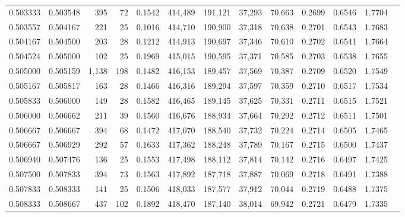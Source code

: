 \begin{tabular}{rrrrrrrrrrrrr}
0.503333 & 0.503548 &   395 &  72 &                                     0.1542 & 414,489 & 191,121 &  37,293 &  70,663 & 0.2699 & 0.6546 & 1.7704 \\
0.503557 & 0.504167 &   221 &  25 &                                     0.1016 & 414,710 & 190,900 &  37,318 &  70,638 & 0.2701 & 0.6543 & 1.7683 \\
0.504167 & 0.504500 &   203 &  28 &                                     0.1212 & 414,913 & 190,697 &  37,346 &  70,610 & 0.2702 & 0.6541 & 1.7664 \\
0.504524 & 0.505000 &   102 &  25 &                                     0.1969 & 415,015 & 190,595 &  37,371 &  70,585 & 0.2703 & 0.6538 & 1.7655 \\
0.505000 & 0.505159 & 1,138 & 198 &                                     0.1482 & 416,153 & 189,457 &  37,569 &  70,387 & 0.2709 & 0.6520 & 1.7549 \\
0.505167 & 0.505817 &   163 &  28 &                                     0.1466 & 416,316 & 189,294 &  37,597 &  70,359 & 0.2710 & 0.6517 & 1.7534 \\
0.505833 & 0.506000 &   149 &  28 &                                     0.1582 & 416,465 & 189,145 &  37,625 &  70,331 & 0.2711 & 0.6515 & 1.7521 \\
0.506000 & 0.506662 &   211 &  39 &                                     0.1560 & 416,676 & 188,934 &  37,664 &  70,292 & 0.2712 & 0.6511 & 1.7501 \\
0.506667 & 0.506667 &   394 &  68 &                                     0.1472 & 417,070 & 188,540 &  37,732 &  70,224 & 0.2714 & 0.6505 & 1.7465 \\
0.506667 & 0.506929 &   292 &  57 &                                     0.1633 & 417,362 & 188,248 &  37,789 &  70,167 & 0.2715 & 0.6500 & 1.7437 \\
0.506940 & 0.507476 &   136 &  25 &                                     0.1553 & 417,498 & 188,112 &  37,814 &  70,142 & 0.2716 & 0.6497 & 1.7425 \\
0.507500 & 0.507833 &   394 &  73 &                                     0.1563 & 417,892 & 187,718 &  37,887 &  70,069 & 0.2718 & 0.6491 & 1.7388 \\
0.507833 & 0.508333 &   141 &  25 &                                     0.1506 & 418,033 & 187,577 &  37,912 &  70,044 & 0.2719 & 0.6488 & 1.7375 \\
0.508333 & 0.508667 &   437 & 102 &                                     0.1892 & 418,470 & 187,140 &  38,014 &  69,942 & 0.2721 & 0.6479 & 1.7335 \\

\end{tabular}
